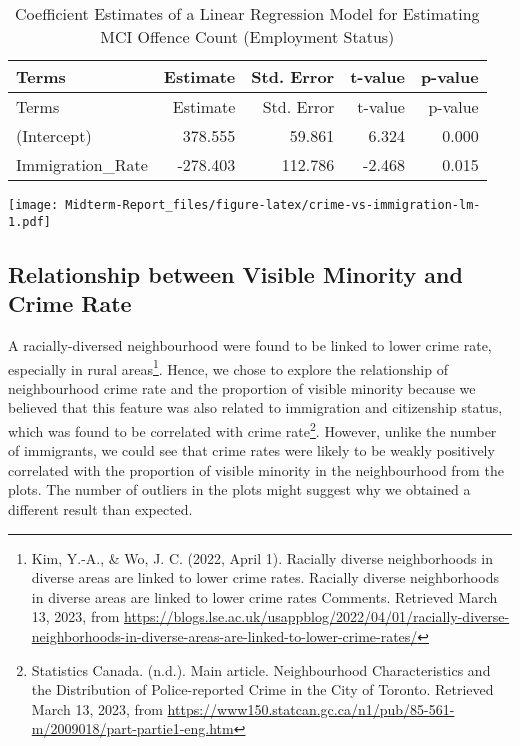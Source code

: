 \documentclass[
]{article}
\begin{document}
\begin{longtable}[]{@{}lrrrr@{}}
\caption{Coefficient Estimates of a Linear Regression Model for
Estimating MCI Offence Count (Employment Status)}\tabularnewline
\toprule()
Terms & Estimate & Std. Error & t-value & p-value \\
\midrule()
\endfirsthead
\toprule()
Terms & Estimate & Std. Error & t-value & p-value \\
\midrule()
\endhead
(Intercept) & 378.555 & 59.861 & 6.324 & 0.000 \\
Immigration\_Rate & -278.403 & 112.786 & -2.468 & 0.015 \\
\bottomrule()
\end{longtable}

\texttt{[image: Midterm-Report\_files/figure-latex/crime-vs-immigration-lm-1.pdf]}

\hypertarget{relationship-between-visible-minority-and-crime-rate}{%
\subsection{Relationship between Visible Minority and Crime
Rate}\label{relationship-between-visible-minority-and-crime-rate}}

A racially-diversed neighbourhood were found to be linked to lower crime
rate, especially in rural areas\footnote{Kim, Y.-A., \& Wo, J. C. (2022,
  April 1). Racially diverse neighborhoods in diverse areas are linked
  to lower crime rates. Racially diverse neighborhoods in diverse areas
  are linked to lower crime rates Comments. Retrieved March 13, 2023,
  from
  \url{https://blogs.lse.ac.uk/usappblog/2022/04/01/racially-diverse-neighborhoods-in-diverse-areas-are-linked-to-lower-crime-rates/}}.
Hence, we chose to explore the relationship of neighbourhood crime rate
and the proportion of visible minority because we believed that this
feature was also related to immigration and citizenship status, which
was found to be correlated with crime rate\footnote{Statistics Canada.
  (n.d.). Main article. Neighbourhood Characteristics and the
  Distribution of Police-reported Crime in the City of Toronto.
  Retrieved March 13, 2023, from
  \url{https://www150.statcan.gc.ca/n1/pub/85-561-m/2009018/part-partie1-eng.htm}}.
However, unlike the number of immigrants, we could see that crime rates
were likely to be weakly positively correlated with the proportion of
visible minority in the neighbourhood from the plots. The number of
outliers in the plots might suggest why we obtained a different result
than expected.
\end{document}

